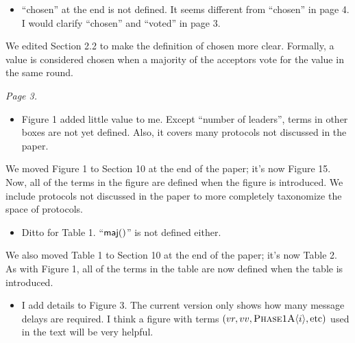 \documentclass[letterpaper,twocolumn,10pt]{article}
\newenvironment{reviewerquote}
{\list{}{\leftmargin=\parindent\rightmargin=0in}\item[] \itshape \color{ReviewerDarkGray}}%
{\endlist}
\begin{document}
\begin{reviewerquote}
  \begin{itemize}
    \item
      ``chosen'' at the end is not defined. It seems different from ``chosen''
      in page 4. I would clarify ``chosen'' and ``voted'' in page 3.
  \end{itemize}
\end{reviewerquote}

We edited Section 2.2 to make the definition of chosen more clear. Formally, a
value is considered chosen when a majority of the acceptors vote for the value
in the same round.

\begin{reviewerquote}
  Page 3.

  \begin{itemize}
    \item
      Figure 1 added little value to me. Except ``number of leaders'', terms in
      other boxes are not yet defined. Also, it covers many protocols not
      discussed in the paper.
  \end{itemize}
\end{reviewerquote}

We moved Figure 1 to Section 10 at the end of the paper; it's now Figure 15.
Now, all of the terms in the figure are defined when the figure is introduced.
We include protocols not discussed in the paper to more completely taxonomize
the space of protocols.

\begin{reviewerquote}
  \begin{itemize}
    \item
      Ditto for Table 1. ``$\textsf{maj}()$'' is not defined either.
  \end{itemize}
\end{reviewerquote}

We also moved Table 1 to Section 10 at the end of the paper; it's now Table 2.
As with Figure 1, all of the terms in the table are now defined when the table
is introduced.

\begin{reviewerquote}
  \begin{itemize}
    \item
      I add details to Figure 3. The current version only shows how many
      message delays are required. I think a figure with terms $(vr, vv,
      \textsc{Phase1A}\langle{i}\rangle, \text{etc})$ used in the text will be very helpful.
  \end{itemize}
\end{reviewerquote}
\end{document}
